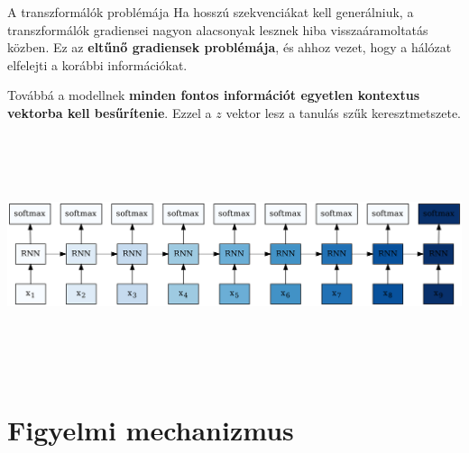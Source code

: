 \documentclass[english, aspectratio=169]{beamer}
\makeatletter
\let\origtableofcontents=\tableofcontents
\def\tableofcontents{\@ifnextchar[{\origtableofcontents}{\gobbletableofcontents}}
\def\gobbletableofcontents#1{\origtableofcontents}
\makeatother
\begin{document}
\begin{frame}{A transzformálók problémája}
Ha hosszú szekvenciákat kell generálniuk, a transzformálók gradiensei nagyon alacsonyak lesznek hiba visszaáramoltatás közben. Ez az \textbf{eltűnő gradiensek problémája}, és ahhoz vezet, hogy a hálózat elfelejti a korábbi információkat.\par\smallskip
Továbbá a modellnek \textbf{minden fontos információt egyetlen kontextus vektorba kell besűrítenie}. Ezzel a $z$ vektor lesz a tanulás szűk keresztmetszete. 
\begin{center}
\includegraphics[width=14cm, height=7cm, keepaspectratio]{graphs/transformer_5.png}
\end{center}
\end{frame}

\section{Figyelmi mechanizmus}

\begin{frame}{}
\tableofcontents[currentsection]
\end{frame}
\end{document}
